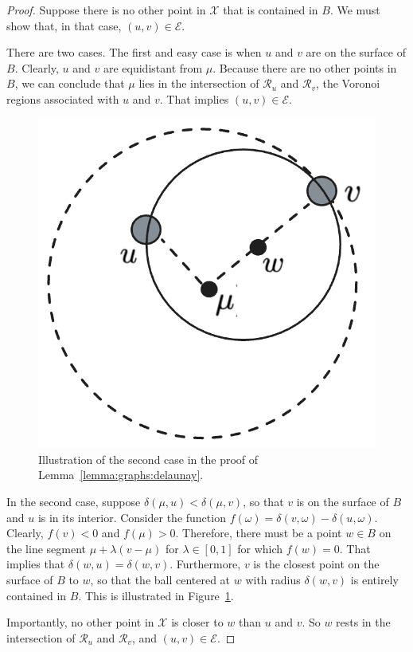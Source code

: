 \begin{proof}
Suppose there is no other point in $\mathcal{X}$ that is contained in $B$.
We must show that, in that case, $(u, v) \in \mathcal{E}$.

There are two cases.
The first and easy case is when $u$ and $v$ are on the surface of $B$.
Clearly, $u$ and $v$ are equidistant from $\mu$.
Because there are no other points in $B$,
we can conclude that $\mu$ lies in the intersection of $\mathcal{R}_u$
and $\mathcal{R}_v$, the Voronoi regions associated with $u$ and $v$.
That implies $(u, v) \in \mathcal{E}$.

\begin{figure}[t]
    \centering
    \includegraphics[width=0.25\linewidth]{figures/graphs-delaunay-proof-lemma.png}
    \caption{Illustration of the second case in the proof of Lemma~\ref{lemma:graphs:delaunay}.}
    \label{figure:graphs:delaunay:proof-lemma}
\end{figure}

In the second case, suppose $\delta(\mu, u) < \delta(\mu, v)$, so that $v$ is on the surface of $B$
and $u$ is in its interior. Consider the function
$f(\omega) = \delta(v, \omega) - \delta(u, \omega)$.
Clearly, $f(v) < 0$ and $f(\mu) > 0$. Therefore, there must be a point $w \in B$
on the line segment $\mu + \lambda (v - \mu)$ for $\lambda \in [0, 1]$ for which
$f(w) = 0$. That implies that $\delta(w, u) = \delta(w, v)$.
Furthermore, $v$ is the closest point on the surface of $B$ to $w$,
so that the ball centered at $w$ with radius $\delta(w, v)$ is entirely contained
in $B$. This is illustrated in Figure~\ref{figure:graphs:delaunay:proof-lemma}.

Importantly, no other point in $\mathcal{X}$ is closer to $w$ than $u$ and $v$.
So $w$ rests in the intersection of $\mathcal{R}_u$ and $\mathcal{R}_v$, and
$(u, v) \in \mathcal{E}$.
\end{proof}

